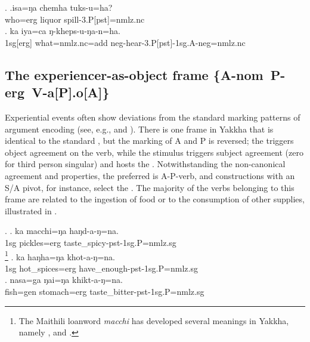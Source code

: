  \ex. \ag.isa=ŋa chemha tuks-u=ha?\\
		who{\sc =erg} liquor spill{\sc -3.P[pst]=nmlz.nc}\\
 \bg. ka iya=ca ŋ-kheps-u-ŋa-n=ha.\\
  {\sc 1sg[erg]} what{\sc =nmlz.nc=add}  {\sc neg}-hear-{\sc 3.P[pst]-1sg.A-neg=nmlz.nc}\\
 
\subsection[The experiencer-as-object frame]{The experiencer-as-object frame %
\mbox{\{A-{\sc nom} P-{\sc erg} V-a[P].o[A]\}}}
\label{tr-objex}


\noindent
Experiential events often show deviations from the standard marking patterns of argument encoding (see, e.g.,  \citealt{Bhaskararao2004_Nonnominative} and  \citealt{Malchukov2008Split}). There is one frame in Yakkha that is identical to the standard , but the marking of A and P is reversed;  the  triggers object agreement on the verb, while the stimulus triggers subject agreement (zero for third person singular) and hosts the   . Notwithstanding the non-canonical agreement and  properties, the preferred  is A-P-verb, and constructions with an S/A pivot, for instance, select the . The majority of the verbs belonging to this frame are related  to the ingestion of food or to the consumption of other supplies, illustrated in \Next.

\ex. \ag. ka macchi=ŋa haŋd-a-ŋ=na.\\
		{\sc 1sg} pickles{\sc =erg} taste\_spicy{\sc -pst-1sg.P=nmlz.sg}\\
		\footnote{The Maithili loanword \emph{macchi} has developed several meanings in Yakkha, namely ,  and .}
	\bg. ka haŋha=ŋa khot-a-ŋ=na.\\	
		{\sc 1sg} hot\_spices{\sc =erg} have\_enough{\sc -pst-1sg.P=nmlz.sg}\\
	\bg. nasa=ga ŋai=ŋa khikt-a-ŋ=na.\\ 
		fish{\sc =gen} stomach{\sc =erg} taste\_bitter{\sc -pst-1sg.P=nmlz.sg}\\
	
